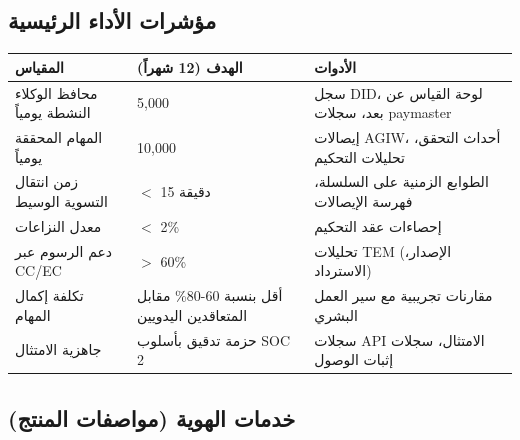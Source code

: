 \documentclass[11pt]{article}
\begin{document}
\subsection{مؤشرات الأداء الرئيسية}
\begin{longtable}{@{}p{}p{}p{}@{}}
\toprule
\textbf{المقياس} & \textbf{الهدف (12 شهراً)} & \textbf{الأدوات} \\\midrule
محافظ الوكلاء النشطة يومياً & 5,000 & سجل DID، لوحة القياس عن بعد، سجلات paymaster \\
المهام المحققة يومياً & 10,000 & إيصالات AGIW، أحداث التحقق، تحليلات التحكيم \\
زمن انتقال التسوية الوسيط & $<$ 15 دقيقة & الطوابع الزمنية على السلسلة، فهرسة الإيصالات \\
معدل النزاعات & $<$ 2\% & إحصاءات عقد التحكيم \\
دعم الرسوم عبر CC/EC & $>$ 60\% & تحليلات TEM (الإصدار، الاسترداد) \\
تكلفة إكمال المهام & أقل بنسبة 60-80\% مقابل المتعاقدين اليدويين & مقارنات تجريبية مع سير العمل البشري \\
جاهزية الامتثال & حزمة تدقيق بأسلوب SOC 2 & سجلات API الامتثال، سجلات إثبات الوصول \\
\bottomrule
\end{longtable}

\subsection{خدمات الهوية (مواصفات المنتج)}
\label{sec:identity-spec}
\end{document}
